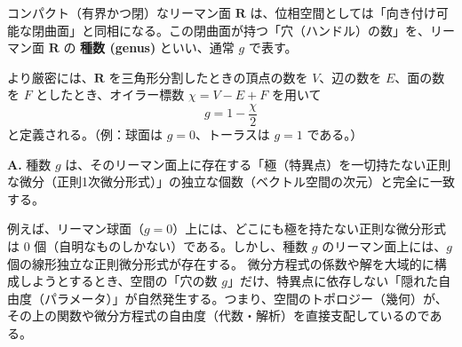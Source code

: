 \begin{definition}[種数]\label{def:genus}
    コンパクト（有界かつ閉）なリーマン面 $\mathbf{R}$ は、位相空間としては「向き付け可能な閉曲面」と同相になる。この閉曲面が持つ「穴（ハンドル）の数」を、リーマン面 $\mathbf{R}$ の \textbf{種数 (genus)} といい、通常 $g$ で表す。
    
    より厳密には、$\mathbf{R}$ を三角形分割したときの頂点の数を $V$、辺の数を $E$、面の数を $F$ としたとき、オイラー標数 $\chi = V - E + F$ を用いて
    \[
    g = 1 - \frac{\chi}{2}
    \]
    と定義される。（例：球面は $g=0$、トーラスは $g=1$ である。）
\end{definition}

\begin{Q}
\textbf{A.} 種数 $g$ は、そのリーマン面上に存在する「極（特異点）を一切持たない正則な微分（正則1次微分形式）」の独立な個数（ベクトル空間の次元）と完全に一致する。

例えば、リーマン球面（$g=0$）上には、どこにも極を持たない正則な微分形式は $0$ 個（自明なものしかない）である。しかし、種数 $g$ のリーマン面上には、$g$ 個の線形独立な正則微分形式が存在する。
微分方程式の係数や解を大域的に構成しようとするとき、空間の「穴の数 $g$」だけ、特異点に依存しない「隠れた自由度（パラメータ）」が自然発生する。つまり、空間のトポロジー（幾何）が、その上の関数や微分方程式の自由度（代数・解析）を直接支配しているのである。
\end{Q}

